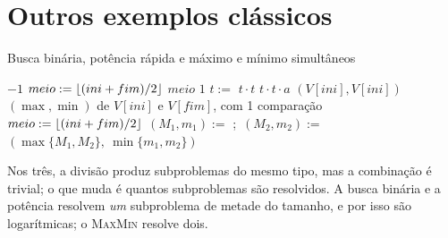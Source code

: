 \section{Outros exemplos clássicos}\label{sec:dcoutros}
\begin{pseudo}{Busca binária, potência rápida e máximo e mínimo simultâneos}
\begin{algorithmic}
 
   \State \Return $-1$ \EndIf
  \State $meio:=\lfloor(ini+fim)/2\rfloor$
   \State \Return $meio$
   \State \Return {}
  \Else \State \Return {}
  \EndIf
\EndFunction
{} 
   \State \Return $1$ \EndIf
  \State $t:=$ 
   \State \Return $t\cdot t$ \Else \State \Return $t\cdot t\cdot a$ \EndIf
\EndFunction
{} 
   \State \Return $(V[ini],V[ini])$ \EndIf
   \State \Return $(\max,\min)$ de $V[ini]$ e $V[fim]$, com 1 comparação \EndIf
  \State $meio:=\lfloor(ini+fim)/2\rfloor$
  \State $(M_1,m_1):=$ ;\ $(M_2,m_2):=$ 
  \State \Return $(\max\{M_1,M_2\},\ \min\{m_1,m_2\})$
\EndFunction
\end{algorithmic}
\end{pseudo}
Nos três, a divisão produz subproblemas do mesmo tipo, mas a combinação é trivial; o que muda é quantos subproblemas são resolvidos. A busca binária e a potência resolvem \emph{um} subproblema de metade do tamanho, e por isso são logarítmicas; o \textsc{MaxMin} resolve dois.

